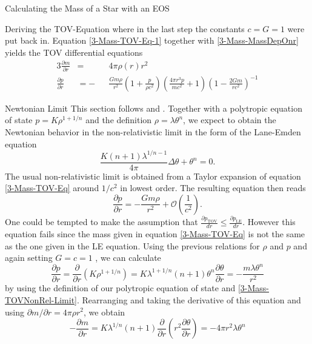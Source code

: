 \begin{section}{Calculating the Mass of a Star with an EOS}
\begin{subsection}{Deriving the TOV-Equation}
where in the last step the constants $c=G=1$ were put back in. Equation \ref{3-Mass-TOV-Eq-1} together with \ref{3-Mass-MassDepOnr} yields the TOV differential equations
\begin{alignat}{3}
	\frac{\partial m}{\partial r} &= &&4\pi\rho(r)r^2\\
	\frac{\partial p}{\partial r} &= -&&\frac{Gm\rho}{r^2}\left(1+\frac{p}{\rho c^2}\right)\left(\frac{4\pi r^3p}{mc^2}+1\right)\left(1-\frac{2Gm}{rc^2}\right)^{-1}
	\label{3-Mass-TOV-Eq}
\end{alignat}
\end{subsection}
%
%
%
\pagebreak
\begin{subsection}{Newtonian Limit}
\label{3-Mass-LEDerivation}
This section follows \cite{weissteinLaneEmdenDifferentialEquation} and \cite[89\psqq]{chandrasekharChandrasekharAnIntroductionStudy1958}. Together with a polytropic equation of state $p=K\rho^{1+1/n}$ and the definition $\rho=\lambda\theta^n$, we expect to obtain the Newtonian behavior in the non-relativistic limit in the form of the Lane-Emden equation
\begin{equation}
	\frac{K(n+1)\lambda^{1/n-1}}{4\pi}\Delta\theta+\theta^n=0.
\end{equation}
The usual non-relativistic limit is obtained from a Taylor expansion of equation \ref{3-Mass-TOV-Eq} around $1/c^2$ in lowest order. The resulting equation then reads
\begin{equation}
	\frac{\partial p}{\partial r} = -\frac{Gm\rho}{r^2} + \mathcal{O}\left(\frac{1}{c^2}\right).
	\label{3-Mass-TOVNonRel-Limit}
\end{equation}
One could be tempted to make the assumption that $\frac{\partial p_{\text{TOV}}}{dr} \leq \frac{\partial p_{\text{LE}}}{dr}.$ However this equation fails since the mass given in equation \ref{3-Mass-TOV-Eq} is not the same as the one given in the LE equation. Using the previous relations for $\rho$ and $p$ and again setting $G=c=1$ , we can calculate
\begin{equation}
	\frac{\partial p}{\partial r} = \frac{\partial}{\partial r}\left(K\rho^{1+1/n}\right)= K\lambda^{1+1/n}(n+1)\theta^n\frac{\partial\theta}{\partial r} = -\frac{m\lambda\theta^n}{r^2}
\end{equation}
by using the definition of our polytropic equation of state and \ref{3-Mass-TOVNonRel-Limit}. Rearranging and taking the derivative of this equation and using $\partial m/\partial r = 4\pi\rho r^2$, we obtain
\begin{equation}
	- \frac{\partial m}{\partial r} = K\lambda^{1/n}(n+1)\frac{\partial}{\partial r}\left(r^2\frac{\partial\theta}{\partial r}\right) = -4\pi r^2\lambda\theta^n

\end{equation}
\end{subsection}
\end{section}
